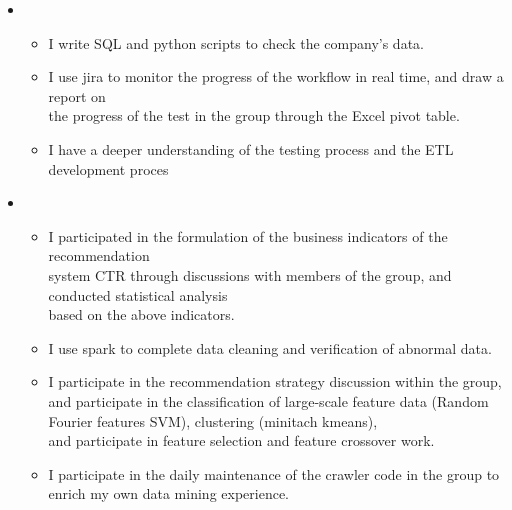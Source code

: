   \begin{itemize}[leftmargin=*]
     \item
        {\small
      \begin{itemize}
      \item I write SQL and python scripts to check the company's data.
        \item I use jira to monitor the progress of the workflow in real time, and draw a report on \\the progress of  the test in the group through the Excel pivot table.
         \item I have a deeper understanding of the testing process and the ETL development proces
         
       \end{itemize}
       }
        \item
           {\small
      \begin{itemize}
      \item I participated in the formulation of the business indicators of the recommendation \\ system CTR through discussions with members of the group, and conducted statistical analysis \\based on the above indicators.
         \item I use spark to complete data cleaning and verification of abnormal data.
          \item I participate in the recommendation strategy discussion within the group, and participate in the classification of large-scale feature data (Random Fourier features SVM), clustering (minitach kmeans), \\ and participate in feature selection and feature crossover work.
           \item I participate in the daily maintenance of the crawler code in the group to enrich my own data mining experience.

            \end{itemize}

}
\end{itemize}
